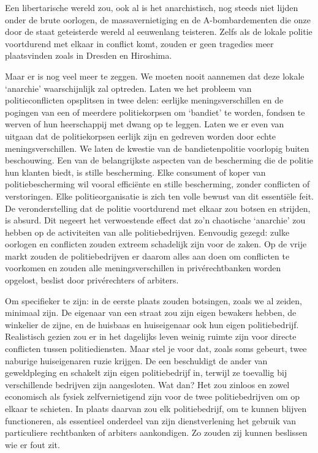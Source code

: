 \documentclass[
  a5paper,
  smalldemyvopaper,10pt,twoside,onecolumn,openright,extrafontsizes,hidelinks]{memoir}
\begin{document}
Een libertarische wereld zou, ook al is het anarchistisch, nog steeds
niet lijden onder de brute oorlogen, de massavernietiging en de
A-bombardementen die onze door de staat geteisterde wereld al eeuwenlang
teisteren. Zelfs als de lokale politie voortdurend met elkaar in
conflict komt, zouden er geen tragedies meer plaatsvinden zoals in
Dresden en Hiroshima.

Maar er is nog veel meer te zeggen. We moeten nooit aannemen dat deze
lokale `anarchie' waarschijnlijk zal optreden. Laten we het probleem van
politieconflicten opsplitsen in twee delen: eerlijke meningsverschillen
en de pogingen van een of meerdere politiekorpsen om `bandiet' te
worden, fondsen te werven of hun heerschappij met dwang op te leggen.
Laten we er even van uitgaan dat de politiekorpsen eerlijk zijn en
gedreven worden door echte meningsverschillen. We laten de kwestie van
de bandietenpolitie voorlopig buiten beschouwing. Een van de
belangrijkste aspecten van de bescherming die de politie hun klanten
biedt, is stille bescherming. Elke consument of koper van
politiebescherming wil vooral efficiënte en stille bescherming, zonder
conflicten of verstoringen. Elke politieorganisatie is zich ten volle
bewust van dit essentiële feit. De veronderstelling dat de politie
voortdurend met elkaar zou botsen en strijden, is absurd. Dit negeert
het verwoestende effect dat zo'n chaotische `anarchie' zou hebben op de
activiteiten van alle politiebedrijven. Eenvoudig gezegd: zulke oorlogen
en conflicten zouden extreem schadelijk zijn voor de zaken. Op de vrije
markt zouden de politiebedrijven er daarom alles aan doen om conflicten
te voorkomen en zouden alle meningsverschillen in privérechtbanken
worden opgelost, beslist door privérechters of arbiters.

Om specifieker te zijn: in de eerste plaats zouden botsingen, zoals we
al zeiden, minimaal zijn. De eigenaar van een straat zou zijn eigen
bewakers hebben, de winkelier de zijne, en de huisbaas en huiseigenaar
ook hun eigen politiebedrijf. Realistisch gezien zou er in het dagelijks
leven weinig ruimte zijn voor directe conflicten tussen politiediensten.
Maar stel je voor dat, zoals soms gebeurt, twee naburige huiseigenaren
ruzie krijgen. De een beschuldigt de ander van geweldpleging en schakelt
zijn eigen politiebedrijf in, terwijl ze toevallig bij verschillende
bedrijven zijn aangesloten. Wat dan? Het zou zinloos en zowel economisch
als fysiek zelfvernietigend zijn voor de twee politiebedrijven om op
elkaar te schieten. In plaats daarvan zou elk politiebedrijf, om te
kunnen blijven functioneren, als essentieel onderdeel van zijn
dienstverlening het gebruik van particuliere rechtbanken of arbiters
aankondigen. Zo zouden zij kunnen beslissen wie er fout zit.
\end{document}
